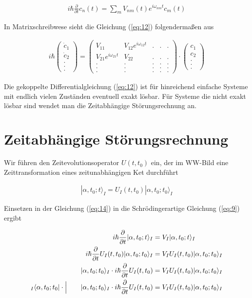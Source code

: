\begin{align}
  \label{eq:12}
  \boxed{i\hbar \frac{\partial}{\partial t}c_n(t) = \sum_m V_{nm}(t) e^{i\omega_{nm}t}c_m(t)}
\end{align}

In Matrixschreibwese sieht die Gleichung (\ref{eq:12}) folgendermaßen aus

\begin{align}
  \label{eq:13}
  i\hbar \begin{pmatrix}\dot c_1\\\dot c_2\\.\\.\\.\end{pmatrix} =
\begin{pmatrix}
V_{11}&V_{12}e^{i\omega_{12}t}&.&.&.\\
V_{21}e^{i\omega_{21}t}&V_{22}&.&.&.\\
  .&.&.&.&.\\
  .&.&.&.&.\\
  .&.&.&.&.
\end{pmatrix}\cdot\begin{pmatrix}c_1\\c_2\\.\\.\\.\end{pmatrix}
\end{align}

Die gekoppelte Differentialgleichung (\ref{eq:12}) ist für hinreichend einfache Systeme mit endlich vielen Zuständen eventuell exakt lösbar. Für Systeme die nicht exakt lösbar sind wendet man die Zeitabhängige Störungsrechnung an.

\section*{Zeitabhängige Störungsrechnung}

Wir führen den Zeitevolutionsoperator \(U(t,t_0)\) ein, der im WW-Bild eine Zeittransformation eines zeitunabhängigen Ket durchführt

\begin{align}
  \label{eq:14}
  |\alpha,t_0;t\rangle_I = U_I(t,t_0)|\alpha,t_0;t_0\rangle_I
\end{align}

Einsetzen in der Gleichung (\ref{eq:14}) in die Schrödingerartige Gleichung (\ref{eq:9}) ergibt

\begin{align}
  \label{eq:15}
   i\hbar \frac{\partial}{\partial t}|\alpha,t_0;t\rangle_I  &= V_I|\alpha,t_0;t\rangle_I \notag\\
 i\hbar \frac{\partial}{\partial t}  U_I(t,t_0)|\alpha,t_0;t_0\rangle_I &= V_I U_I(t,t_0)|\alpha,t_0;t_0\rangle_I  \notag\\
|\alpha,t_0;t_0\rangle_I \cdot i\hbar \frac{\partial}{\partial t}  U_I(t,t_0) &= V_I U_I(t,t_0)|\alpha,t_0;t_0\rangle_I \notag\\
 _I\langle \alpha,t_0;t_0| \cdot\Big|\qquad |\alpha,t_0;t_0\rangle_I \cdot i\hbar \frac{\partial}{\partial t}  U_I(t,t_0) &= V_I U_I(t,t_0)|\alpha,t_0;t_0\rangle_I
\end{align}

